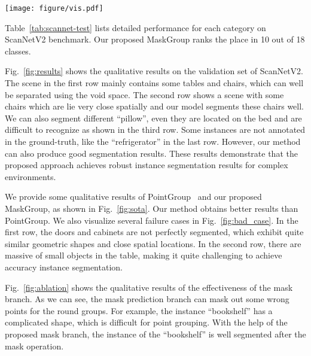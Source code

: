 \documentclass{article}
\begin{document}
\begin{figure*}[htb]
	\begin{center}
		\texttt{[image: figure/vis.pdf]}
	\end{center}
	\vspace{-1em}
	\caption{Visualization of the hierarchical point grouping and the mask prediction.}
	\label{fig:ablation}
\end{figure*}

Table~\ref{tab:scannet-test} lists detailed performance for each category on ScanNetV2 benchmark. Our proposed MaskGroup ranks the  place in 10 out of 18 classes.

Fig.~\ref{fig:results} shows the qualitative results on the validation set of ScanNetV2.
The scene in the first row mainly contains some tables and chairs, which can well be separated using the void space.
The second row shows a scene with some chairs which are lie very close spatially and our model segments these chairs well.
We can also segment different ``pillow'', even they are located on the bed and are difficult to recognize as shown in the third row. 
Some instances are not annotated in the ground-truth, like the ``refrigerator'' in the last row. However, our method can also produce good segmentation results.
These results demonstrate that the proposed approach achieves robust instance segmentation results for complex environments.

We provide some qualitative results of PointGroup~\cite{pointgroup} and our proposed MaskGroup, as shown in Fig.~\ref{fig:sota}. Our method obtains better results than PointGroup.
We also visualize several failure cases in Fig.~\ref{fig:bad_case}. In the first row, the doors and cabinets are not perfectly segmented, which exhibit quite similar geometric shapes and close spatial locations. In the second row, there are massive of small objects in the table, making it quite challenging to achieve accuracy instance segmentation.

Fig.~\ref{fig:ablation} shows the qualitative results of the effectiveness of the mask branch. 
As we can see, the mask prediction branch can mask out some wrong points for the  round groups.
For example, the instance ``bookshelf'' has a complicated shape, which is difficult for point grouping. With the help of the proposed mask branch, the instance of the ``bookshelf'' is well segmented after the mask operation.
\end{document}
